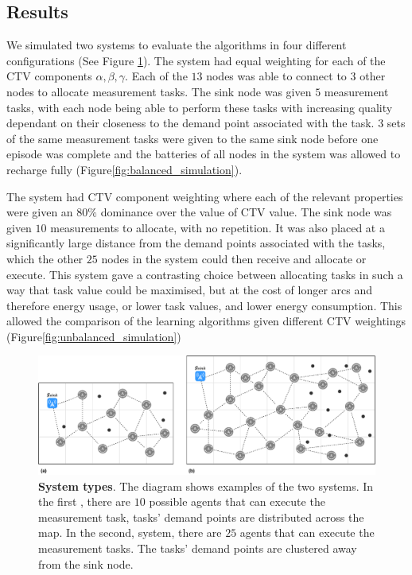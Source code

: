 \subsection{Results}

We simulated two systems to evaluate the algorithms in four different configurations (See Figure \ref{fig:system-types}). The \simulationSimple{}{} system had equal weighting for each of the CTV components $\alpha, \beta, \gamma$. Each of the $13$ nodes was able to connect to $3$ other nodes to allocate measurement tasks. The sink node was given $5$ measurement tasks, with each node being able to perform these tasks with increasing quality dependant on their closeness to the demand point associated with the task. $3$ sets of the same measurement tasks were given to the same sink node before one episode was complete and the batteries of all nodes in the system was allowed to recharge fully (Figure\ref{fig:balanced_simulation}). 

The \simulationExtended{}{} system had CTV component weighting where each of the relevant properties were given an $80\%$ dominance over the value of CTV value. The sink node was given $10$ measurements to allocate, with no repetition. It was also placed at a significantly large distance from the demand points associated with the tasks, which the other $25$ nodes in the system could then receive and allocate or execute. This system gave a contrasting choice between allocating tasks in such a way that task value could be maximised, but at the cost of longer arcs and therefore energy usage, or lower task values, and lower energy consumption. This allowed the comparison of the learning algorithms given different CTV weightings (Figure\ref{fig:unbalanced_simulation})

\begin{figure}[ht]
	\centering
	\includegraphics[width=0.9\linewidth]{system-types}
	\caption{\textbf{System types}. The diagram shows examples of the two systems. In the first \simulationSimple{}{}, there are $10$ possible agents that can execute the measurement task, tasks' demand points are distributed across the map. In the second, \simulationExtended{}{} system, there are $25$ agents that can execute the measurement tasks. The tasks' demand points are clustered away from the sink node.}
	\label{fig:system-types}
\end{figure}

